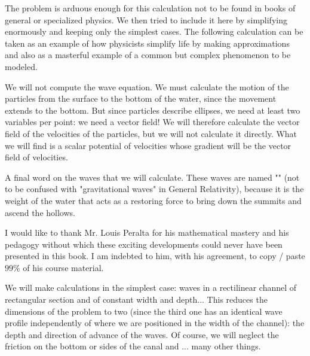 	The problem is arduous enough for this calculation not to be found in books of general or specialized physics. We then tried to include it here by simplifying enormously and keeping only the simplest cases. The following calculation can be taken as an example of how physicists simplify life by making approximations and also as a masterful example of a common but complex phenomenon to be modeled.

	We will not compute the wave equation. We must calculate the motion of the particles from the surface to the bottom of the water, since the movement extends to the bottom. But since particles describe ellipses, we need at least two variables per point: we need a vector field! We will therefore calculate the vector field of the velocities of the particles, but we will not calculate it directly. What we will find is a scalar potential of velocities whose gradient will be the vector field of velocities.

	A final word on the waves that we will calculate. These waves are named "" (not to be confused with "gravitational waves" in General Relativity), because it is the weight of the water that acts as a restoring force to bring down the summits and ascend the hollows.

	I would like to thank Mr. Louis Peralta for his mathematical mastery and his pedagogy without which these exciting developments could never have been presented in this book. I am indebted to him, with his agreement, to copy / paste $99\%$ of his course material.

	We will make calculations in the simplest case: waves in a rectilinear channel of rectangular section and of constant width and depth... This reduces the dimensions of the problem to two (since the third one has an identical wave profile independently of where we are positioned in the width of the channel): the depth and direction of advance of the waves. Of course, we will neglect the friction on the bottom or sides of the canal and ... many other things.

